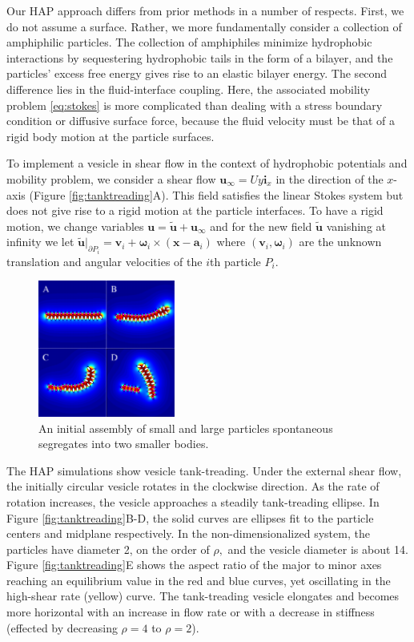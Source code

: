 Our HAP approach differs from prior methods in a number of respects. 
First, we do not assume a surface. Rather, we more fundamentally  consider a collection of amphiphilic particles.
The collection of amphiphiles minimize hydrophobic interactions by sequestering hydrophobic tails in the form of a bilayer, and the particles' excess free energy gives rise to an elastic bilayer energy. 
The second difference lies in the fluid-interface coupling. Here, the associated mobility problem \eqref{eq:stokes} 
is more complicated than dealing with a stress boundary condition or diffusive surface force, 
because the fluid velocity must be that of a rigid body motion at the particle surfaces.

To implement a vesicle in shear flow in the context of hydrophobic potentials and mobility problem, 
we consider a shear flow $\mathbf{u}_{\infty} = Uy\mathbf{i}_x$ in the direction of the $x$-axis
(Figure \ref{fig:tanktreading}A).
This field satisfies the linear Stokes system but does not give rise to a rigid motion at the particle interfaces. 
To have a rigid motion, we change variables $\mathbf{u} = \tilde{\mathbf{u}}+ \mathbf{u}_{\infty}$ and 
for the new field $\tilde{\mathbf{u}}$ vanishing at infinity we let 
$\tilde{\mathbf{u}}|_{\partial P_i} = \mathbf{v}_i + \boldsymbol{\omega}_i \times (\mathbf{x} - \mathbf{a}_i)$ 
where $(\mathbf{v}_i,\boldsymbol{\omega}_i)$ are the unknown translation and angular velocities of the 
$i$th particle $P_i.$  

\begin{figure}
\centerline{\includegraphics[width=0.4\textwidth]{figures/PW_fig2.pdf}}
\caption{\label{fig:demixing} An initial assembly of small and 
large particles spontaneous segregates into two smaller bodies. }
\end{figure}
The HAP simulations show vesicle tank-treading. Under the external shear flow, the initially circular 
vesicle rotates in the clockwise direction. As the rate of rotation increases, the vesicle approaches
a steadily tank-treading ellipse. In Figure \ref{fig:tanktreading}B-D, the solid curves are ellipses fit to the particle centers
and midplane respectively. In the non-dimensionalized system, the particles have diameter 2, on the order of $\rho,$ 
and the vesicle diameter is about 14. 
Figure \ref{fig:tanktreading}E shows the aspect ratio of the major to minor axes reaching an equilibrium value in the 
red and blue curves, yet oscillating in the high-shear rate (yellow) curve.
The tank-treading vesicle elongates and becomes more horizontal 
with an increase in flow rate or 
with a decrease in stiffness (effected by decreasing $\rho = 4$ to $\rho = 2$). 



